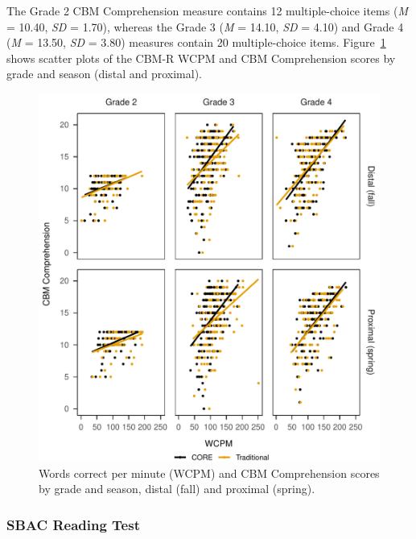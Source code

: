 \documentclass[
  english,
  man, fleqn, noextraspace]{apa6}
\begin{document}
The Grade 2 CBM Comprehension measure contains 12 multiple-choice items (\emph{M} = 10.40, \emph{SD} = 1.70), whereas the Grade 3 (\emph{M} = 14.10, \emph{SD} = 4.10) and Grade 4 (\emph{M} = 13.50, \emph{SD} = 3.80) measures contain 20 multiple-choice items. Figure~\ref{fig:fig-comp-scatter} shows scatter plots of the CBM-R WCPM and CBM Comprehension scores by grade and season (distal and proximal).



\begin{figure}
\centering
\includegraphics{demo_files/figure-latex/fig-comp-scatter-1.pdf}
\caption{\label{fig:fig-comp-scatter}Words correct per minute (WCPM) and CBM Comprehension scores by grade and season, distal (fall) and proximal (spring).}
\end{figure}

\hypertarget{sbac-reading-test}{%
\subsubsection{SBAC Reading Test}\label{sbac-reading-test}}
\end{document}
